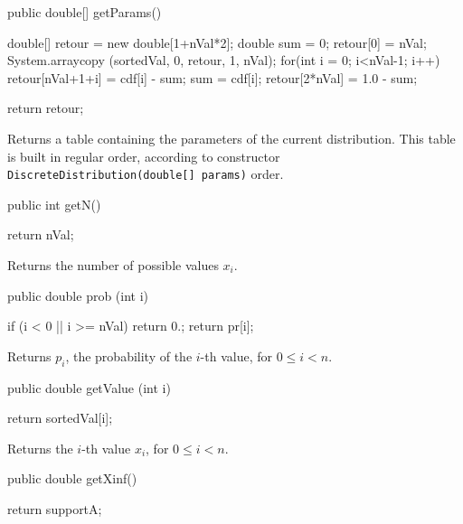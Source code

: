 \begin{code}

   public double[] getParams()\begin{hide} {
      double[] retour = new double[1+nVal*2];
      double sum = 0;
      retour[0] = nVal;
      System.arraycopy (sortedVal, 0, retour, 1, nVal);
      for(int i = 0; i<nVal-1; i++) {
         retour[nVal+1+i] = cdf[i] - sum;
         sum = cdf[i];
      }
      retour[2*nVal] = 1.0 - sum;

      return retour;
   }\end{hide}
\end{code}
\begin{tabb}
   Returns a table containing the parameters of the current distribution.
   This table is built in regular order, according to constructor
   \texttt{DiscreteDistribution(double[] params)} order.
\end{tabb}
\begin{code}

   public int getN()\begin{hide} {
      return nVal;
   }\end{hide}
\end{code}
\begin{tabb} Returns the number of possible values $x_i$.
\end{tabb}
\begin{code}

   public double prob (int i)\begin{hide} {
      if (i < 0 || i >= nVal)
         return 0.;
      return pr[i];
   }\end{hide}
\end{code}
\begin{tabb}  Returns $p_i$, the probability of
  the $i$-th value, for $0\le i<n$.
\end{tabb}
\begin{htmlonly}
\end{htmlonly}
\begin{code}

   public double getValue (int i)\begin{hide} {
      return sortedVal[i];
   }\end{hide}
\end{code}
\begin{tabb}
   Returns the $i$-th value $x_i$, for $0\le i<n$.
\end{tabb}
\begin{code}

   public double getXinf()\begin{hide} {
      return supportA;
   }\end{hide}
\end{code}
